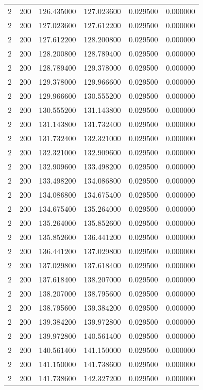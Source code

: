 \begin{longtable}{rrrrrr}
2 & 200 & 126.435000 & 127.023600 & 0.029500 & 0.000000 \\
2 & 200 & 127.023600 & 127.612200 & 0.029500 & 0.000000 \\
2 & 200 & 127.612200 & 128.200800 & 0.029500 & 0.000000 \\
2 & 200 & 128.200800 & 128.789400 & 0.029500 & 0.000000 \\
2 & 200 & 128.789400 & 129.378000 & 0.029500 & 0.000000 \\
2 & 200 & 129.378000 & 129.966600 & 0.029500 & 0.000000 \\
2 & 200 & 129.966600 & 130.555200 & 0.029500 & 0.000000 \\
2 & 200 & 130.555200 & 131.143800 & 0.029500 & 0.000000 \\
2 & 200 & 131.143800 & 131.732400 & 0.029500 & 0.000000 \\
2 & 200 & 131.732400 & 132.321000 & 0.029500 & 0.000000 \\
2 & 200 & 132.321000 & 132.909600 & 0.029500 & 0.000000 \\
2 & 200 & 132.909600 & 133.498200 & 0.029500 & 0.000000 \\
2 & 200 & 133.498200 & 134.086800 & 0.029500 & 0.000000 \\
2 & 200 & 134.086800 & 134.675400 & 0.029500 & 0.000000 \\
2 & 200 & 134.675400 & 135.264000 & 0.029500 & 0.000000 \\
2 & 200 & 135.264000 & 135.852600 & 0.029500 & 0.000000 \\
2 & 200 & 135.852600 & 136.441200 & 0.029500 & 0.000000 \\
2 & 200 & 136.441200 & 137.029800 & 0.029500 & 0.000000 \\
2 & 200 & 137.029800 & 137.618400 & 0.029500 & 0.000000 \\
2 & 200 & 137.618400 & 138.207000 & 0.029500 & 0.000000 \\
2 & 200 & 138.207000 & 138.795600 & 0.029500 & 0.000000 \\
2 & 200 & 138.795600 & 139.384200 & 0.029500 & 0.000000 \\
2 & 200 & 139.384200 & 139.972800 & 0.029500 & 0.000000 \\
2 & 200 & 139.972800 & 140.561400 & 0.029500 & 0.000000 \\
2 & 200 & 140.561400 & 141.150000 & 0.029500 & 0.000000 \\
2 & 200 & 141.150000 & 141.738600 & 0.029500 & 0.000000 \\
2 & 200 & 141.738600 & 142.327200 & 0.029500 & 0.000000 \\

\end{longtable}
